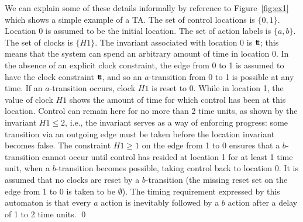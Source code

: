 {\begin{exampleb}
We can explain some of these details informally by reference to
Figure~\ref{fig:ex1} which shows a simple example of a TA.  The set of
control locations is $\{0,1\}$. Location 0 is assumed to be the
initial location. The set of action labels is $\{a,b\}$. The set of
clocks is $\{H1\}$.  The invariant associated with location $0$ is
$\text{\sf t\!t}$; this means that the system can spend an arbitrary amount of
time in location 0. In the absence of an explicit clock constraint, the
edge from 0 to 1 is assumed to have the clock constraint $\text{\sf t\!t}$,
and so an $a$-transition from 0 to 1 is possible at any time. If an
$a$-transition occurs, clock $H1$ is reset to 0. While in location 1,
the value of clock $H1$ shows the amount of time for which control has
been at this location. Control can remain here for no more than 2 time
units, as shown by the invariant $H1
\leq 2$, i.e., the invariant serves as a way of enforcing progress:
some transition via an outgoing edge must be taken before the location
invariant becomes false. The constraint $H1 \geq 1$ on the edge from
1 to 0 ensures that a $b$-transition cannot occur until control has
resided at location 1 for at least 1 time unit, when a $b$-transition
becomes possible, taking control back to location 0. It is assumed
that no clocks are reset by a $b$-transition (the missing reset set on
the edge from 1 to 0 is taken to be $\emptyset$). The timing
requirement expressed by this automaton is that every $a$ action is
inevitably followed by a $b$ action after a delay of 1 to 2 time units.
\qed
\end{exampleb}

}
